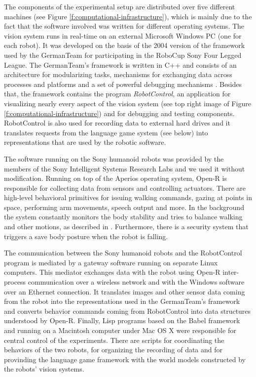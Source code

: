The components of the experimental setup are distributed over five
different machines (see Figure \ref{f:computational-infrastructure}),
which is mainly due to the fact that the software involved was written
for different operating systems. The vision system runs in real-time
on an external Microsoft Windows PC (one for each robot). It was
developed on the basis of the 2004 version of the framework used by
the GermanTeam \citep{roefer04germanteam} for participating in the
RoboCup \citep{kitano97robocup} Sony Four Legged League. The
GermanTeam's framework is written in C++ and consists of an
architecture for modularizing tasks, mechanisms for exchanging data
across processes and platforms and a set of powerful debugging
mechanisms \citep{roefer03architecture}.  Besides that, the framework
contains the program \emph{RobotControl}, an application for
visualizing nearly every aspect of the vision system (see top right
image of Figure \ref{f:computational-infrastructure}) and for
debugging and testing components. RobotControl is also used for
recording data to external hard drives and it translates requests from
the language game system (see below) into representations that are
used by the robotic software.

The software running on the Sony humanoid robots was provided by the
members of the Sony Intelligent Systems Research Labs and we used it
without modification. Running on top of the Aperios operating system,
Open-R \citep{fujita97open,ishida01motion} is responsible for
collecting data from sensors and controlling actuators. There are
high-level behavioral primitives for issuing walking commands, gazing
at points in space, performing arm movements, speech output and
more. In the background the system constantly monitors the body
stability and tries to balance walking and other motions, as described
in \citep{nagasaka04integrated}. Furthermore, there is a security
system that triggers a save body posture when the robot is falling.


The communication between the Sony humanoid robots and the
RobotControl program is mediated by a gateway software running on
separate Linux computers. This mediator exchanges data with the robot
using Open-R inter-process communication over a wireless network and
with the Windows software over an Ethernet connection. It translates
images and other sensor data coming from the robot into the
representations used in the GermanTeam's framework and converts
behavior commands coming from RobotControl into data structures
understood by Open-R. Finally, Lisp programs based on the Babel
framework
\citep{loetzsch08babel2,loetzsch09understanding,steels10babel,loetzsch12tools}
and running on a Macintosh computer under Mac OS X were responsible
for central control of the experiments. There are scripts for
coordinating the behaviors of the two robots, for organizing the
recording of data and for provinding the language game framework with
the world models constructed by the robots' vision systems.

